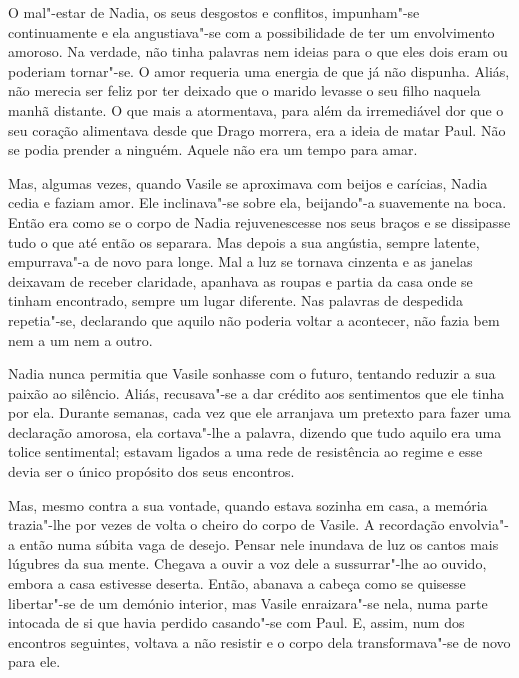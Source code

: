 O mal"-estar de Nadia, os seus desgostos e conflitos, impunham"-se
continuamente e ela angustiava"-se com a possibilidade de ter um
envolvimento amoroso. Na verdade, não tinha palavras nem ideias para o
que eles dois eram ou poderiam tornar"-se. O amor requeria uma energia de
que já não dispunha. Aliás, não merecia ser feliz por ter deixado que o
marido levasse o seu filho naquela manhã distante. O que mais a
atormentava, para além da irremediável dor que o seu coração
alimentava desde que Drago morrera, era a ideia de matar Paul. Não se
podia prender a ninguém. Aquele não era um tempo para amar.

Mas, algumas vezes, quando Vasile se aproximava com beijos e carícias,
Nadia cedia e faziam amor. Ele inclinava"-se sobre ela, beijando"-a suavemente na boca. Então era como se o corpo
de Nadia rejuvenescesse nos seus braços e se dissipasse tudo o que até
então os separara. Mas depois a sua angústia, sempre latente,
empurrava"-a de novo para longe. Mal a luz se tornava cinzenta e as
janelas deixavam de receber claridade, apanhava as roupas e partia da
casa onde se tinham encontrado, sempre um lugar diferente. Nas palavras
de despedida repetia"-se, declarando que aquilo não poderia voltar a
acontecer, não fazia bem nem a um nem a outro.


Nadia nunca permitia que Vasile sonhasse com o futuro, tentando reduzir
a sua paixão ao silêncio. Aliás, recusava"-se a dar crédito aos sentimentos que ele tinha por ela. Durante
semanas, cada vez que ele arranjava um pretexto para fazer uma
declaração amorosa, ela cortava"-lhe a palavra, dizendo que tudo aquilo
era uma tolice sentimental; estavam ligados a uma rede de resistência
ao regime e esse devia ser o único propósito dos seus encontros.

Mas, mesmo contra a sua vontade, quando estava sozinha em casa, a
memória trazia"-lhe por vezes de volta o cheiro do corpo de Vasile. A
recordação envolvia"-a então numa súbita vaga de desejo. Pensar nele
inundava de luz os cantos mais lúgubres da sua mente. Chegava a ouvir a
voz dele a sussurrar"-lhe ao ouvido, embora a casa estivesse deserta.
Então, abanava a cabeça como se quisesse libertar"-se de um demónio interior, mas Vasile enraizara"-se nela, numa parte
intocada de si que havia perdido casando"-se com Paul. E, assim, num dos
encontros seguintes, voltava a não resistir e o corpo dela
transformava"-se de novo para ele.

\bigskip

